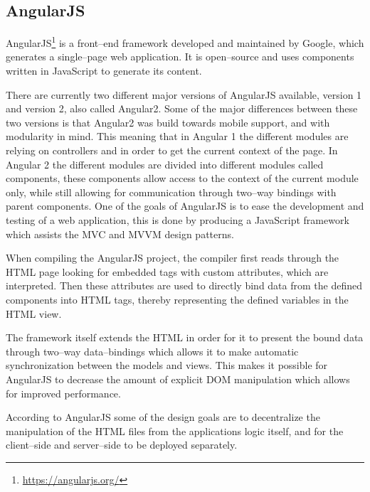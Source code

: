\subsection{AngularJS}\label{ssec:angular}
AngularJS\footnote{\url{https://angularjs.org/}} is a front--end framework developed and maintained by Google, which generates a single--page web application.
It is open--source and uses components written in JavaScript to generate its content.

\bigskip
There are currently two different major versions of AngularJS available, version 1 and version 2, also called Angular2\cite{angular_1_2}.
Some of the major differences between these two versions is that Angular2 was build towards mobile support, and with modularity in mind.
This meaning that in Angular 1 the different modules are relying on controllers and  in order to get the current context of the page.
In Angular 2 the different modules are divided into different modules called components, these components allow access to the context of the current module only, while still allowing for communication through two--way bindings with parent components.
One of the goals of AngularJS is to ease the development and testing of a web application, this is done by producing a JavaScript framework which assists the MVC and MVVM design patterns.

\bigskip
When compiling the AngularJS project, the compiler first reads through the HTML page looking for embedded tags with custom attributes, which are interpreted.
Then these attributes are used to directly bind data from the defined components into HTML tags, thereby representing the defined variables in the HTML view.

The framework itself extends the HTML in order for it to present the bound data through two--way data--bindings which allows it to make automatic synchronization between the models and views.
This makes it possible for AngularJS to decrease the amount of explicit \ac{DOM} manipulation which allows for improved performance.

According to AngularJS some of the design goals are to decentralize the manipulation of the HTML files from the applications logic itself, and for the client--side and server--side to be deployed separately.
